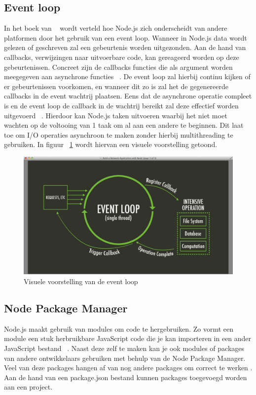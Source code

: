 \subsection{Event loop}
In het boek van ~\textcite{Ali2013} wordt verteld hoe Node.js zich onderscheidt van andere platformen door het gebruik van een event loop.
Wanneer in Node.js data wordt gelezen of geschreven zal een gebeurtenis worden uitgezonden. 
Aan de hand van callbacks, verwijzingen naar uitvoerbare code, kan gereageerd worden op deze gebeurtenissen. 
Concreet zijn de callbacks functies die als argument worden meegegeven aan asynchrone functies ~\autocite{Kumar2023}. 
De event loop zal hierbij continu kijken of er gebeurtenissen voorkomen, en wanneer dit zo is zal het de gegenereerde callbacks in de event wachtrij plaatsen.
Eens dat de asynchrone operatie compleet is en de event loop de callback in de wachtrij bereikt zal deze effectief worden uitgevoerd ~\autocite{Kumar2023}.
Hierdoor kan Node.js taken uitvoeren waarbij het niet moet wachten op de voltooing van 1 taak om al aan een andere te beginnen. 
Dit laat toe om I/O operaties asynchroon te maken zonder hierbij multithreading te gebruiken.
In figuur ~\ref{fig:eventloop} wordt hiervan een visuele voorstelling getoond.
\begin{figure}[h]
    \centering
    \includegraphics[width=.9\textwidth]{graphics/eventloop.png}
    \caption{\label{fig:eventloop}Visuele voorstelling van de event loop ~\autocite{Luxembourg2023}}
\end{figure}

\subsection{Node Package Manager}
Node.js maakt gebruik van modules om code te hergebruiken. 
Zo vormt een module een stuk herbruikbare JavaScript code 
die je kan importeren in een ander JavaScript bestand ~\autocite{Semah2022}.
Naast deze zelf te maken kan je ook modules of packages van andere ontwikkelaars gebruiken met behulp van de Node Package Manager.
Veel van deze packages hangen af van nog andere packages om correct te werken \autocite{kula2017}.
Aan de hand van een package.json bestand kunnen packages toegevoegd worden aan een project.

